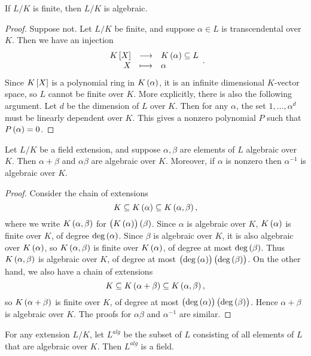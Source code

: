 \begin{proposition}
If $ L / K $ is finite, then $ L / K $ is algebraic.
\end{proposition}

\begin{proof}
Suppose not. Let $ L / K $ be finite, and suppose $ \alpha \in L $ is transcendental over $ K $. Then we have an injection
$$ \function{K\sbr{X}}{K\br{\alpha} \subseteq L}{X}{\alpha}. $$
Since $ K\sbr{X} $ is a polynomial ring in $ K\br{\alpha} $, it is an infinite dimensional $ K $-vector space, so $ L $ cannot be finite over $ K $. More explicitly, there is also the following argument. Let $ d $ be the dimension of $ L $ over $ K $. Then for any $ \alpha $, the set $ 1, \dots, \alpha^d $ must be linearly dependent over $ K $. This gives a nonzero polynomial $ P $ such that $ P\br{\alpha} = 0 $.
\end{proof}

\pagebreak

\begin{corollary}
Let $ L / K $ be a field extension, and suppose $ \alpha, \beta $ are elements of $ L $ algebraic over $ K $. Then $ \alpha + \beta $ and $ \alpha\beta $ are algebraic over $ K $. Moreover, if $ \alpha $ is nonzero then $ \alpha^{-1} $ is algebraic over $ K $.
\end{corollary}

\begin{proof}
Consider the chain of extensions
$$ K \subseteq K\br{\alpha} \subseteq K\br{\alpha, \beta}, $$
where we write $ K\br{\alpha, \beta} $ for $ \br{K\br{\alpha}}\br{\beta} $. Since $ \alpha $ is algebraic over $ K $, $ K\br{\alpha} $ is finite over $ K $, of degree $ \deg\br{\alpha} $. Since $ \beta $ is algebraic over $ K $, it is also algebraic over $ K\br{\alpha} $, so $ K\br{\alpha, \beta} $ is finite over $ K\br{\alpha} $, of degree at most $ \deg\br{\beta} $. Thus $ K\br{\alpha, \beta} $ is algebraic over $ K $, of degree at most $ \br{\deg\br{\alpha}}\br{\deg\br{\beta}} $. On the other hand, we also have a chain of extensions
$$ K \subseteq K\br{\alpha + \beta} \subseteq K\br{\alpha, \beta}, $$
so $ K\br{\alpha + \beta} $ is finite over $ K $, of degree at most $ \br{\deg\br{\alpha}}\br{\deg\br{\beta}} $. Hence $ \alpha + \beta $ is algebraic over $ K $. The proofs for $ \alpha\beta $ and $ \alpha^{-1} $ are similar.
\end{proof}

\begin{corollary}
For any extension $ L / K $, let $ L^{alg} $ be the subset of $ L $ consisting of all elements of $ L $ that are algebraic over $ K $. Then $ L^{alg} $ is a field.
\end{corollary}

